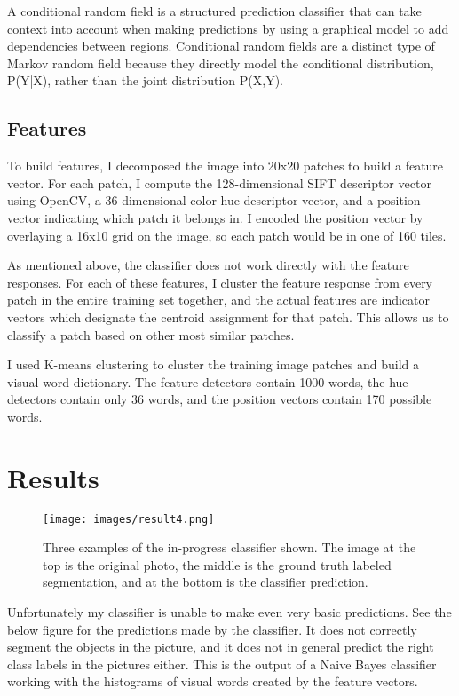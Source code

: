 \documentclass{article}
\begin{document}
A conditional random field is a structured prediction classifier that
can take context into account when making predictions by using a
graphical model to add dependencies between regions.  Conditional random fields are a distinct
type of Markov random field because they directly model the conditional
distribution, P(Y|X), rather than the joint distribution P(X,Y).

\subsection{Features}

To build features, I decomposed the image into 20x20 patches to build
a feature vector. For each patch, I compute the 128-dimensional
SIFT descriptor vector using OpenCV, a 36-dimensional color hue descriptor
vector, and a position vector indicating which patch it belongs in. I encoded the
position vector by overlaying a 16x10 grid on the image, so each patch would be in
one of 160 tiles.

As mentioned above, the classifier does not work directly with the feature
responses. For each of these features, I cluster the feature response from
every patch in the entire training set together, and the actual features
are indicator vectors which designate the centroid assignment for that patch.
This allows us to classify a patch based on other most similar patches.

I used K-means clustering to cluster the training image patches and build a visual word dictionary. The feature detectors contain 1000 words, the hue detectors contain only 36 words, and the position vectors contain 170 possible words. 

\section{Results}

\begin{figure}
\texttt{[image: images/result4.png]}
\caption{Three examples of the in-progress classifier shown. The image at the top is the original photo, the middle is the ground truth labeled segmentation, and at the bottom is the classifier prediction.}
\end{figure}

Unfortunately my classifier is unable to make even very basic predictions. See the below figure for the predictions made by the classifier. It does not correctly segment the objects in the picture, and it does not in general predict the right class labels in the pictures either. This is the output of a Naive Bayes classifier working with the histograms of visual words created by the feature vectors. 
\end{document}
